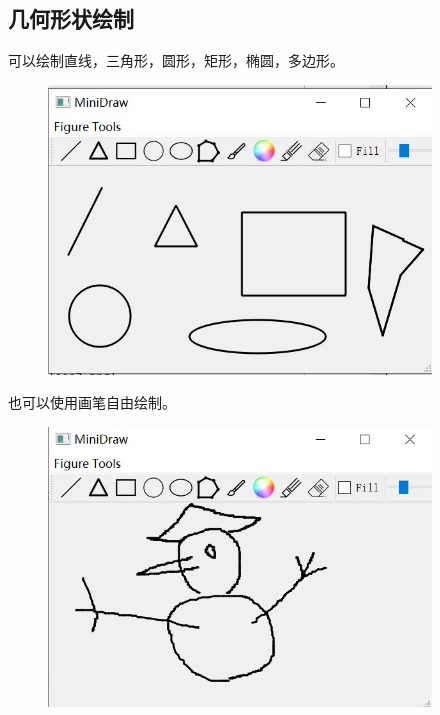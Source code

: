 \documentclass{article}
\begin{document}
	\subsection{几何形状绘制}
	可以绘制直线，三角形，圆形，矩形，椭圆，多边形。
	\begin{figure}[htb]
		\begin{center}
			\includegraphics[width=4in]{geo.jpg}
		\end{center}
	\end{figure}
	\clearpage
	也可以使用画笔自由绘制。
	\begin{figure}[htb]
		\begin{center}
			\includegraphics[width=4in]{draw.jpg}
		\end{center}
	\end{figure}
	
\end{document}

